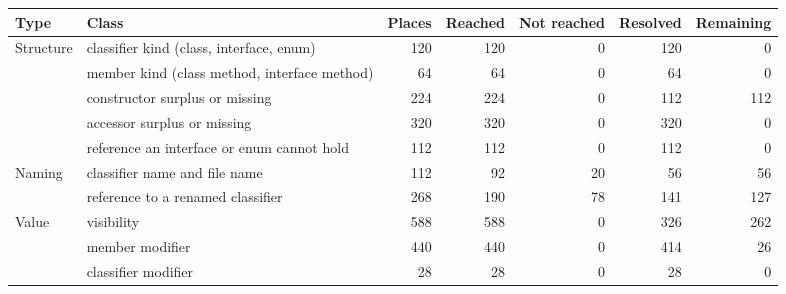 \begin{table}
    \centering
    \begin{tabularx}{0.95\textheight}{|l|>{\raggedright\arraybackslash}X|r|r|r|r|r|}
        \hline
        \textbf{Type} & \textbf{Class}                               & \textbf{Places} & \textbf{Reached} & \textbf{Not reached} & \textbf{Resolved} & \textbf{Remaining} \\
        \hline
        Structure     & classifier kind (class, interface, enum)     & 120             & 120              & 0                    & 120               & 0                  \\
        \hline
                      & member kind (class method, interface method) & 64              & 64               & 0                    & 64                & 0                  \\
        \hline
                      & constructor surplus or missing               & 224             & 224              & 0                    & 112               & 112                \\
        \hline
                      & accessor surplus or missing                  & 320             & 320              & 0                    & 320               & 0                  \\
        \hline
                      & reference an interface or enum cannot hold   & 112             & 112              & 0                    & 112               & 0                  \\
        \hline
        Naming        & classifier name and file name                & 112             & 92               & 20                   & 56                & 56                 \\
        \hline
                      & reference to a renamed classifier            & 268             & 190              & 78                   & 141               & 127                \\
        \hline
        Value         & visibility                                   & 588             & 588              & 0                    & 326               & 262                \\
        \hline
                      & member modifier                              & 440             & 440              & 0                    & 414               & 26                 \\
        \hline
                      & classifier modifier                          & 28              & 28               & 0                    & 28                & 0                  \\

\end{tabularx}
\end{table}
